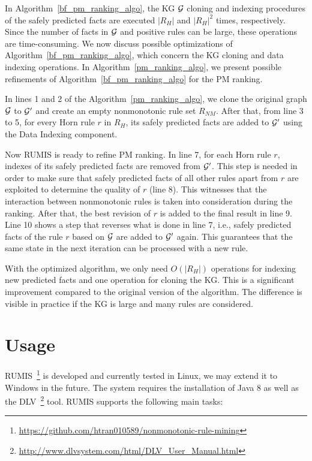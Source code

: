 In Algorithm~\ref{bf_pm_ranking_algo}, the KG $\mathcal{G}$ cloning and indexing procedures of the safely predicted facts are executed $|R_H|$ and $|R_H|^2$ times, respectively. Since the number of facts in $\mathcal{G}$ and positive rules can be large, these operations are time-consuming. We now discuss possible optimizations of Algorithm~\ref{bf_pm_ranking_algo}, which concern the KG cloning and data indexing operations. In Algorithm~\ref{pm_ranking_algo}, we present possible refinements of Algorithm~\ref{bf_pm_ranking_algo} for the PM ranking.

In lines 1 and 2 of the Algorithm~\ref{pm_ranking_algo}, we clone the original graph $\mathcal{G}$ to $\mathcal{G}'$ and create an empty nonmonotonic rule set $R_{NM}$. After that, from line 3 to 5, for every Horn rule $r$ in $R_H$, its safely predicted facts are added to $\mathcal{G}'$ using the Data Indexing component.

Now RUMIS is ready to refine PM ranking. In line 7, for each Horn rule $r$, indexes of its safely predicted facts are removed from $\mathcal{G}'$. This step is needed in order to make sure that safely predicted facts of all other rules apart from $r$ are exploited to determine the quality of $r$ (line 8). This witnesses that the interaction between nonmonotonic rules is taken into consideration during the ranking. After that, the best revision of $r$ is added to the final result in line 9. Line 10 shows a step that reverses what is done in line 7, i.e., safely predicted facts of the rule $r$ based on $\mathcal{G}$ are added to $\mathcal{G}'$ again. This guarantees that the same state in the next iteration can be processed with a new rule.

With the optimized algorithm, we only need $O(|R_H|)$ operations for indexing new predicted facts and one operation for cloning the KG. This is a significant improvement compared to the original version of the algorithm. The difference is visible in practice if the KG is large and many rules are considered.

\section{Usage}

RUMIS~\footnote{\url{https://github.com/htran010589/nonmonotonic-rule-mining}} is developed and currently tested in Linux, we may extend it to Windows in the future. The system requires the installation of Java 8 as well as the DLV~\footnote{\url{http://www.dlvsystem.com/html/DLV_User_Manual.html}} tool. RUMIS supports the following main tasks:

